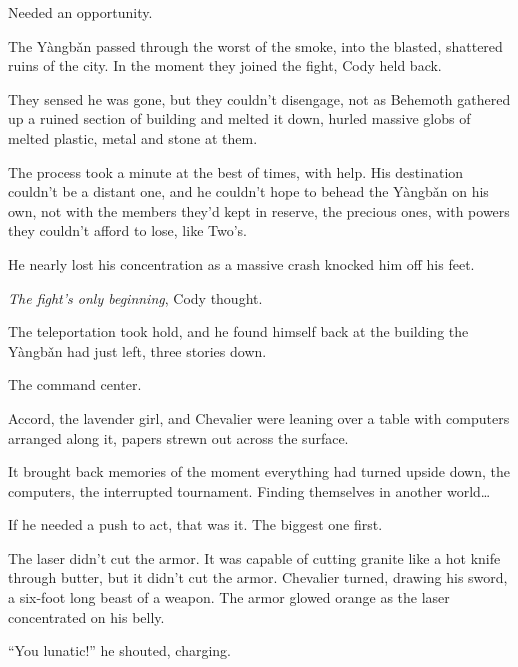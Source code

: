 Needed an opportunity.



The Y\`{a}ngb\v{a}n passed through the worst of the smoke, into the blasted, shattered ruins of the city.  In the moment they joined the fight, Cody held back.



They sensed he was gone, but they couldn't disengage, not as Behemoth gathered up a ruined section of building and melted it down, hurled massive globs of melted plastic, metal and stone at them.



The process took a minute at the best of times, with help.  His destination couldn't be a distant one, and he couldn't hope to behead the Y\`{a}ngb\v{a}n on his own, not with the members they'd kept in reserve, the precious ones, with powers they couldn't afford to lose, like Two's.



He nearly lost his concentration as a massive crash knocked him off his feet.



\emph{The fight's only beginning}, Cody thought.



The teleportation took hold, and he found himself back at the building the Y\`{a}ngb\v{a}n had just left, three stories down.



The command center.



Accord, the lavender girl, and Chevalier were leaning over a table with computers arranged along it, papers strewn out across the surface.



It brought back memories of the moment everything had turned upside down, the computers, the interrupted tournament.  Finding themselves in another world\ldots



If he needed a push to act, that was it.  The biggest one first.



The laser didn't cut the armor.  It was capable of cutting granite like a hot knife through butter, but it didn't cut the armor.  Chevalier turned, drawing his sword, a six-foot long beast of a weapon.  The armor glowed orange as the laser concentrated on his belly.



``You lunatic!'' he shouted, charging.



